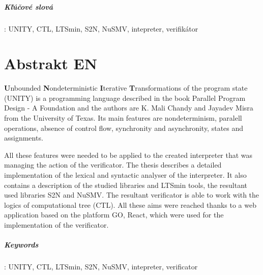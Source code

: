 \documentclass[12pt, a4paper, oneside]{book}
\begin{document}
\paragraph*{Kľúčové slová}: UNITY, CTL, LTSmin, S2N, NuSMV, intepreter, verifikátor


\chapter*{Abstrakt EN}\label{chap:abstract_en}
\textbf{U}nbounded \textbf{N}ondeterministic 
\textbf{I}terative \textbf{T}ransformations of the program state
(UNITY) is a programming language described in the book Parallel Program Design -
A Foundation and the authors are K. Mali Chandy and Jayadev Misra from the University of 
Texas. Its main features are nondeterminism, paralell operations, absence of control flow, 
synchronity and asynchronity, states and assignments.

All these features were needed to be applied to the created interpreter that was 
managing the action of the verificator. The thesis describes a detailed implementation 
of the lexical and syntactic analyser of the interpreter. It also contains a description 
of the studied libraries and LTSmin tools, the resultant used libraries S2N and NuSMV. 
The resultant verificator is able to work with the logics of computational tree (CTL). 
All these aims were reached thanks to a web application based on the platform GO, React, 
which were used for the implementation of the verificator.

\paragraph*{Keywords}: UNITY, CTL, LTSmin, S2N, NuSMV, intepreter, verificator
%
%
%

\tableofcontents
\listoffigures
\listoftables

\mainmatter


% 


% 




\backmatter

\nocite{*}

%
\end{document}
